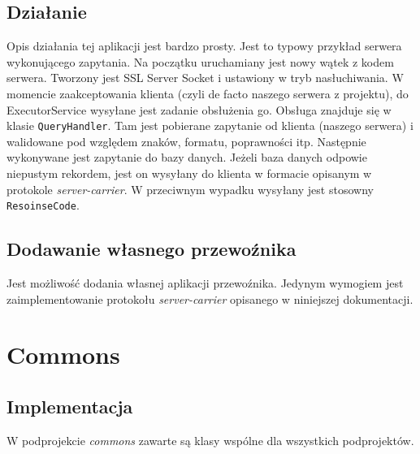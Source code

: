 \documentclass[pdftex,13pt,a4paper]{article}
\begin{document}
\subsection{Działanie}
Opis działania tej aplikacji jest bardzo prosty. Jest to typowy przykład serwera wykonującego zapytania. Na początku uruchamiany jest nowy wątek z kodem serwera. Tworzony jest SSL Server Socket i ustawiony w tryb nasłuchiwania. W momencie zaakceptowania klienta (czyli de facto naszego serwera z projektu), do ExecutorService wysyłane jest zadanie obsłużenia go. Obsługa znajduje się w klasie \texttt{QueryHandler}. Tam jest pobierane zapytanie od klienta (naszego serwera) i walidowane pod względem znaków, formatu, poprawności itp. Następnie wykonywane jest zapytanie do bazy danych. Jeżeli baza danych odpowie niepustym rekordem, jest on wysyłany do klienta w formacie opisanym w protokole \textit{server-carrier}. W przeciwnym wypadku wysyłany jest stosowny \texttt{ResoinseCode}.

\subsection{Dodawanie własnego przewoźnika}
Jest możliwość dodania własnej aplikacji przewoźnika. Jedynym wymogiem jest zaimplementowanie protokołu \textit{server-carrier} opisanego w niniejszej dokumentacji.

\section{Commons}

\subsection{Implementacja}

W podprojekcie \textit{commons} zawarte są klasy wspólne dla wszystkich podprojektów.
\end{document}
